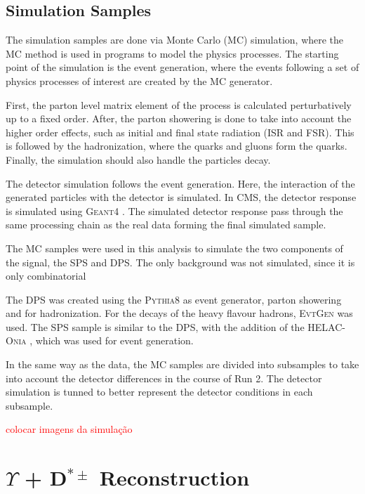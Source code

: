 \subsection{Simulation Samples}

The simulation samples are done via Monte Carlo (MC) simulation, where the MC method is used in programs to model the physics processes. The starting point of the simulation is the event generation, where the events following a set of physics processes of interest are created by the MC generator.

First, the parton level matrix element of the process is calculated perturbatively up to a fixed order. After, the parton showering is done to take into account the higher order effects, such as initial and final state radiation (ISR and FSR). This is followed by the hadronization, where the quarks and gluons form the quarks. Finally, the simulation should also handle the particles decay.

The detector simulation follows the event generation. Here, the interaction of the generated particles with the detector is simulated. In CMS, the detector response is simulated using \textsc{Geant4} \cite{GEANT4:2002zbu}. The simulated detector response pass through the same processing chain as the real data forming the final simulated sample.

The MC samples were used in this analysis to simulate the two components of the signal, the SPS and DPS. The only background was not simulated, since it is only combinatorial

The DPS was created using the \textsc{Pythia8} \cite{Sjostrand:2014zea} as event generator, parton showering and for hadronization. For the decays of the heavy flavour hadrons, \textsc{EvtGen} \cite{Lange:2001uf} was used. The SPS sample is similar to the DPS, with the addition of the \textsc{HELAC-Onia} \cite{Shao:2012iz, Shao:2015vga}, which was used for event generation.

In the same way as the data, the MC samples are divided into subsamples to take into account the detector differences in the course of Run 2. The detector simulation is tunned to better represent the detector conditions in each subsample.

\textcolor{red}{colocar imagens da simulação}

\section{\texorpdfstring{$\Upsilon$ + D$^{*\pm}$}{Y+D*} Reconstruction}


